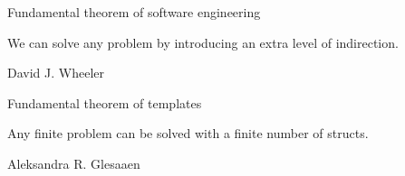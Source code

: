 \documentclass[14pt]{beamer}
\begin{document}
\begin{frame}[fragile]
\begin{onlyenv}
    \nointerlineskip
    
  \end{onlyenv}

\end{frame}

\begin{frame}

  \begin{center}\fontsize{16pt}{16pt}\selectfont\color{Tropiteal}
    Fundamental theorem of software engineering
  \end{center}

  \vspace{.25cm}
  \begin{center}
    \begin{minipage}{8cm}
      We can solve any problem by introducing an extra level of indirection.
    \end{minipage}
  \end{center}

  \vspace{.25cm}
  \begin{flushright}\color{ICantExpress!50!WhiteTrash}
    David J. Wheeler
  \end{flushright}

\end{frame}

\begin{frame}

  \begin{center}\fontsize{16pt}{16pt}\selectfont\color{Tropiteal}
    Fundamental theorem of templates
  \end{center}

  \vspace{.25cm}
  \begin{center}
    \begin{minipage}{8cm}
      Any finite problem can be solved with a finite number of structs.
    \end{minipage}
  \end{center}

  \vspace{.25cm}
  \begin{flushright}\color{ICantExpress!50!WhiteTrash}
    Aleksandra R. Glesaaen
  \end{flushright}

\end{frame}
\end{document}
